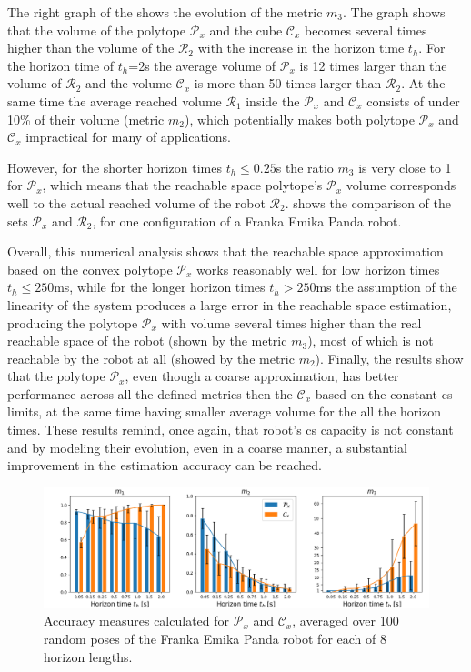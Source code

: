 The right graph of the  shows the evolution of the metric $m_3$. The graph shows that the volume of the polytope $\mathcal{P}_x$ and the cube $\mathcal{C}_x$ becomes several times higher than the volume of the $\mathcal{R}_2$ with the increase in the horizon time $t_h$. For the horizon time of $t_h$=2s the average volume of $\mathcal{P}_x$ is 12 times larger than the volume of $\mathcal{R}_2$ and the volume $\mathcal{C}_x$ is more than 50 times larger than $\mathcal{R}_2$. At the same time the average reached volume $\mathcal{R}_1$ inside the $\mathcal{P}_x$ and $\mathcal{C}_x$ consists of under 10\% of their volume (metric $m_2$), which potentially makes both polytope $\mathcal{P}_x$ and $\mathcal{C}_x$ impractical for many of applications.

However, for the shorter horizon times $t_h\leq0.25$s the ratio $m_3$ is very close to 1 for $\mathcal{P}_x$, which means that the reachable space polytope's $\mathcal{P}_x$ volume corresponds well to the actual reached volume of the robot $\mathcal{R}_2$.   shows the comparison of the sets $\mathcal{P}_x$ and $\mathcal{R}_2$, for one configuration of a Franka Emika Panda robot.



Overall, this numerical analysis shows that the reachable space approximation based on the convex polytope $\mathcal{P}_x$ works reasonably well for low horizon times $t_h\leq250$ms, while for the longer horizon times $t_h>250$ms the assumption of the linearity of the system produces a large error in the reachable space estimation, producing the polytope $\mathcal{P}_x$ with volume several times higher than the real reachable space of the robot (shown by the metric $m_3$), most of which is not reachable by the robot at all (showed by the metric $m_2$). Finally, the results show that the polytope $\mathcal{P}_x$, even though a coarse approximation, has better performance across all the defined metrics then the $\mathcal{C}_x$ based on the constant \gls{cs} limits, at the same time having smaller average volume for the all the horizon times. These results remind, once again, that robot's \gls{cs} capacity is not constant and by modeling their evolution, even in a coarse manner, a substantial improvement in the estimation accuracy can be reached.


\begin{figure}[!t]
    \centering
    \includegraphics[width=\textwidth]{Papers/images/metrics_results_double.png}
    \caption{Accuracy measures calculated for $\mathcal{P}_x$ and $\mathcal{C}_x$, averaged over 100 random poses of the Franka Emika Panda robot for each of 8 horizon lengths.}
    \label{fig:accuracy}
    
\end{figure}


